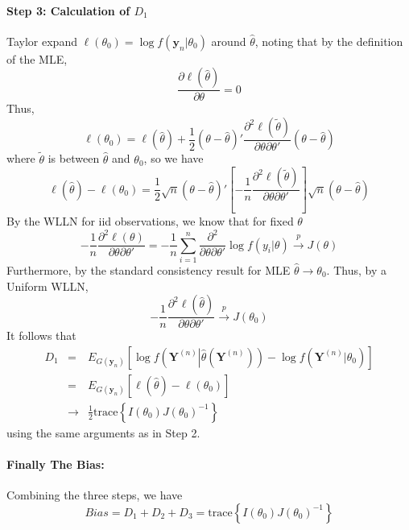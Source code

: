 \documentclass[12pt]{article}
\theoremstyle{definition}
\begin{document}
\paragraph{Step 3: Calculation of $D_1$} Taylor expand $\ell(\theta_0) = \log{f\left(\mathbf{y}_n| \theta_0\right)}$ around $\hat{\theta}$, noting that by the definition of the MLE, 
	$$\frac{\partial \ell(\hat{\theta})}{\partial \theta} = 0$$
Thus,
	$$\ell(\theta_0) = \ell(\hat{\theta}) + \frac{1}{2} \left( \theta - \hat{\theta} \right)' \frac{\partial^2  \ell(\tilde{\theta})}{\partial \theta \partial \theta'} \left( \theta - \hat{\theta} \right)$$
where $\tilde{\theta}$ is between $\hat{\theta}$ and $\theta_0$, so we have
	$$ \ell(\hat{\theta}) - \ell(\theta_0)  = \frac{1}{2} \sqrt{n}\left( \theta - \hat{\theta} \right)'\left[ - \frac{1}{n} \frac{\partial^2  \ell(\tilde{\theta})}{\partial \theta \partial \theta'} \right]\sqrt{n}\left( \theta - \hat{\theta} \right)$$
By the WLLN for iid observations, we know that for fixed $\theta$
	$$- \frac{1}{n} \frac{\partial^2  \ell(\theta)}{\partial \theta \partial \theta'} = -\frac{1}{n}\sum_{i=1}^n \frac{\partial^2}{\partial \theta \partial \theta'}\log{f(y_i|\theta)}\overset{p}{\rightarrow} J(\theta)$$
Furthermore, by the standard consistency result for MLE $\hat{\theta} \rightarrow \theta_0$. Thus, by a Uniform WLLN,
	$$- \frac{1}{n} \frac{\partial^2  \ell(\hat{\theta})}{\partial \theta \partial \theta'}\overset{p}{\rightarrow} J(\theta_0)$$
It follows that 	
	\begin{eqnarray*}
		D_1 &=& E_{G(\mathbf{y}_n)}\left[ \log{f\left(\left.\mathbf{Y}^{(n)}\right|\hat{\theta}\left(\mathbf{Y}^{(n)}\right)\right)} - \log{f\left( \mathbf{Y}^{(n)}|\theta_0 \right)}\right]\\
			&=& E_{G(\mathbf{y}_n)}\left[ \ell(\hat{\theta}) - \ell(\theta_0) \right]\\
			&\rightarrow& \frac{1}{2} \mbox{trace}\left\{ I(\theta_0) J(\theta_0)^{-1} \right\}
	\end{eqnarray*}
using the same arguments as in Step 2.  
\paragraph{Finally The Bias:} Combining the three steps, we have
	$$Bias = D_1 + D_2 + D_3 = \mbox{trace}\left\{ I(\theta_0)J(\theta_0)^{-1} \right\}$$
	
\end{document}
